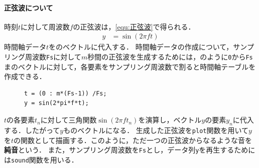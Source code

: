 \paragraph{正弦波について}時刻\(t\)に対して周波数\(f\)の正弦波は，\eqref{equ:正弦波}で得られる．
\begin{align}
    y & =\sin(2\pi ft)\label{equ:正弦波}
\end{align}
時間軸データ\(t\)をのベクトルに代入する．
時間軸データの作成について，サンプリング周波数\texttt{Fs}に対して\(m\)秒間の正弦波を生成するためには，のように\texttt{0}から\texttt{Fs}まのベクトルに対して，各要素をサンプリング周波数で割ると時間軸テーブルを作成できる．\par
\begin{figure}
    \vspace{-1.3cm}
    \begin{lstlisting}[caption={時間軸作成と正弦波の作成},numbers={none},label={src:時間軸作成と正弦波の作成}]
t = (0 : m*(Fs-1)) /Fs;
y = sin(2*pi*f*t);
\end{lstlisting}
    \vspace{-.5cm}
\end{figure}
\(t\)の各要素\(t_n\)に対して三角関数\(\sin(2\pi ft_n)\)を演算し，ベクトル\(y\)の要素\(y_n\)に代入する．したがって\(y\)ものベクトルになる．
生成した正弦波を\texttt{plot}関数を用いて\(y\)を\(t\)の関数として描画する．このように，ただ一つの正弦波からなるような音を\textbf{純音}という．\cite[p.1]{音響工学理論基礎}
また，サンプリング周波数を\texttt{Fs}とし，データ列\texttt{y}を再生するためには\texttt{sound}関数を用いる．\par
